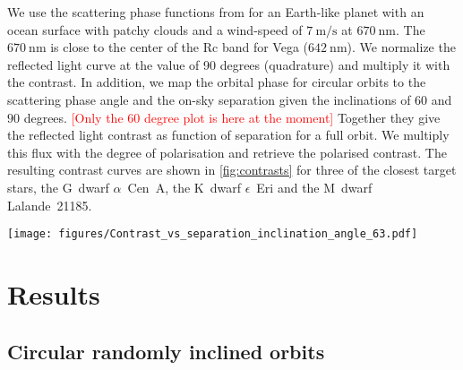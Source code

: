 \documentclass[
    usenatbib,
]{mnras}
\newcommand{\todo}[1]{\textcolor{red}{[#1]}}
\newcommand{\IWA}{\ensuremath{\mathrm{IWA}}}
\newcommand{\hwo}{HabWorlds}
\begin{document}
We use the scattering phase functions from \cite{treesstam2019} for an Earth-like planet with an ocean surface with patchy clouds and a wind-speed of $\SI{7}{\meter\per\second}$ at $\SI{670}{\nano\meter}$.
%
The $\SI{670}{\nano\meter}$ is close to the center of the Rc band for Vega ($\SI{642}{\nano\meter}$). 
%
We normalize the reflected light curve at the value of 90 degrees (quadrature) and multiply it with the contrast.
%
In addition, we map the orbital phase for circular orbits to the scattering phase angle and the on-sky separation given the inclinations of $60$ and $90$ degrees. \todo{Only the 60 degree plot is here at the moment}
%
Together they give the reflected light contrast as function of separation for a full orbit.
%
We multiply this flux with the degree of polarisation and retrieve the polarised contrast.
%
The resulting contrast curves are shown in \cref{fig:contrasts} for three of the closest target stars, the G~dwarf $\alpha$~Cen~A, the K~dwarf $\epsilon$~Eri and the M~dwarf Lalande~21185.

\begin{figure*}%
   \centering
   \texttt{[image: figures/Contrast\_vs\_separation\_inclination\_angle\_63.pdf]}
   \caption{
    The reflected light contrast and orbital separation of an Earth-like planet with an ocean surface and patchy clouds over a planetary orbit assuming an orbital inclination of $60^\circ$ for the stars $\alpha$ Cen A, $\epsilon$ Eri and Lalande 21185. The solid line indicates the contrast in unpolarised light with the contrast at quadrature marked by a solid dot. The polarised component is indicated by the colored dots for which the color represents the scattering phase angle from quadrature. The light grey points show the quadrature contrasts of the other targets in the star list and the dashed lines indicate $1,2$ and $3$ times the \IWA\ for \hwo.
    }
    \label{fig:contrasts}
\end{figure*}


\section{Results}


\subsection{Circular randomly inclined orbits}
\label{sec:circular}
\end{document}

